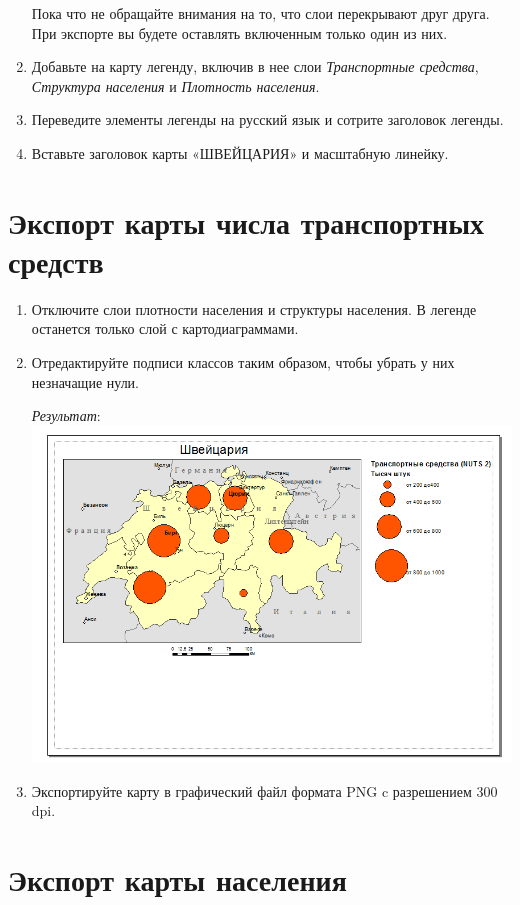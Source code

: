 \documentclass[12pt,]{book}
\begin{document}
\begin{enumerate}
  Пока что не обращайте внимания на то, что слои перекрывают друг друга. При экспорте вы будете оставлять включенным только один из них.
\item
  Добавьте на карту легенду, включив в нее слои \emph{Транспортные средства}, \emph{Структура населения} и \emph{Плотность населения}.
\item
  Переведите элементы легенды на русский язык и сотрите заголовок легенды.
\item
  Вставьте заголовок карты «ШВЕЙЦАРИЯ» и масштабную линейку.
\end{enumerate}

\hypertarget{stat-map-economic-export-transport}{%
\section{Экспорт карты числа транспортных средств}\label{stat-map-economic-export-transport}}

\begin{enumerate}
\def\labelenumi{\arabic{enumi}.}
\item
  Отключите слои плотности населения и структуры населения. В легенде останется только слой с картодиаграммами.
\item
  Отредактируйте подписи классов таким образом, чтобы убрать у них незначащие нули.

  \emph{Результат}:
  \includegraphics{images/Ex08/image33.png}
\item
  Экспортируйте карту в графический файл формата PNG c разрешением 300 dpi.
\end{enumerate}

\hypertarget{stat-map-economic-export-population}{%
\section{Экспорт карты населения}\label{stat-map-economic-export-population}}
\end{document}
